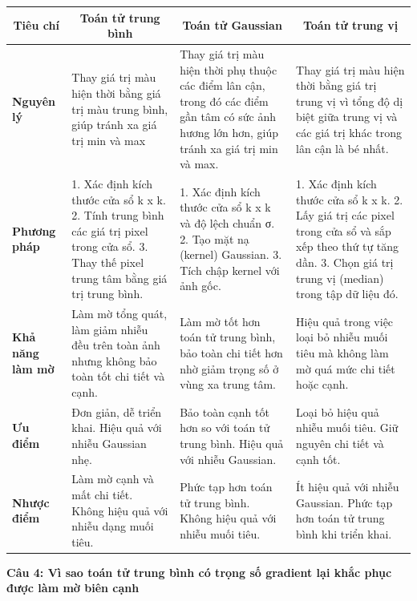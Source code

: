 \begin{table}[H]
	\centering
	\begin{tabular}{|p{2cm}|p{4cm}|p{4cm}|p{4cm}|}
		\hline
		\multicolumn{1}{|c|}{\textbf{Tiêu chí}} &
		\multicolumn{1}{c|}{\textbf{Toán tử trung bình}} &
		\multicolumn{1}{c|}{\textbf{Toán tử Gaussian}} &
		\multicolumn{1}{c|}{\textbf{Toán tử trung vị}} \\ \hline
		\textbf{Nguyên lý} &
		Thay giá trị màu hiện thời bằng giá trị màu trung bình, giúp tránh xa giá trị min và max &
		Thay giá trị màu hiện thời phụ thuộc các điểm lân cận, trong đó các điểm gần tâm có sức ảnh hương lớn hơn, giúp tránh xa giá trị min và max. &
		Thay giá trị màu hiện thời bằng giá trị trung vị vì tổng độ dị biệt giữa trung vị và các giá trị khác trong lân cận là bé nhất. \\ \hline
		\textbf{Phương pháp} &
		1. Xác định kích thước cửa sổ k x k. 2. Tính trung bình các giá trị pixel trong cửa sổ. 3. Thay thế pixel trung tâm bằng giá trị trung bình. &
		1. Xác định kích thước cửa sổ k x k và độ lệch chuẩn σ. 2. Tạo mặt nạ (kernel) Gaussian. 3. Tích chập kernel với ảnh gốc. &
		1. Xác định kích thước cửa sổ k x k. 2. Lấy giá trị các pixel trong cửa sổ và sắp xếp theo thứ tự tăng dần. 3. Chọn giá trị trung vị (median) trong tập dữ liệu đó. \\ \hline
		\textbf{Khả năng làm mờ} &
		Làm mờ tổng quát, làm giảm nhiễu đều trên toàn ảnh nhưng không bảo toàn tốt chi tiết và cạnh. &
		Làm mờ tốt hơn toán tử trung bình, bảo toàn chi tiết hơn nhờ giảm trọng số ở vùng xa trung tâm. &
		Hiệu quả trong việc loại bỏ nhiễu muối tiêu mà không làm mờ quá mức chi tiết hoặc cạnh. \\ \hline
		\textbf{Ưu điểm} &
		Đơn giản, dễ triển khai. Hiệu quả với nhiễu Gaussian nhẹ. &
		Bảo toàn cạnh tốt hơn so với toán tử trung bình. Hiệu quả với nhiễu Gaussian. &
		Loại bỏ hiệu quả nhiễu muối tiêu. Giữ nguyên chi tiết và cạnh tốt. \\ \hline
		\textbf{Nhược điểm} &
		Làm mờ cạnh và mất chi tiết. Không hiệu quả với nhiễu dạng muối tiêu. &
		Phức tạp hơn toán tử trung bình. Không hiệu quả với nhiễu muối tiêu. &
		Ít hiệu quả với nhiễu Gaussian. Phức tạp hơn toán tử trung bình khi triển khai. \\ \hline
	\end{tabular}
\end{table}

\textbf{Câu 4: Vì sao toán tử trung bình có trọng số gradient lại khắc phục được làm mờ biên cạnh}

